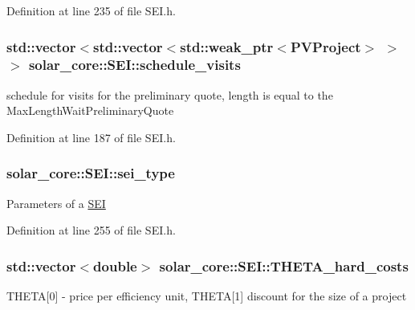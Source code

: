 Definition at line 235 of file S\+E\+I.\+h.

\hypertarget{classsolar__core_1_1_s_e_i_a8729d1aaf89da5d7d8b52761b65c881c}{}
\subsubsection[{schedule\+\_\+visits}]{\setlength{\rightskip}{0pt plus 5cm}std\+::vector$<$std\+::vector$<$std\+::weak\+\_\+ptr$<${\bf P\+V\+Project}$>$ $>$ $>$ solar\+\_\+core\+::\+S\+E\+I\+::schedule\+\_\+visits\hspace{0.3cm}{\ttfamily [protected]}}\label{classsolar__core_1_1_s_e_i_a8729d1aaf89da5d7d8b52761b65c881c}
schedule for visits for the preliminary quote, length is equal to the Max\+Length\+Wait\+Preliminary\+Quote 

Definition at line 187 of file S\+E\+I.\+h.

\hypertarget{classsolar__core_1_1_s_e_i_a788ef7ae27cee8b9b99b57eba9ab2981}{}
\subsubsection[{sei\+\_\+type}]{ solar\+\_\+core\+::\+S\+E\+I\+::sei\+\_\+type\hspace{0.3cm}{\ttfamily [protected]}}\label{classsolar__core_1_1_s_e_i_a788ef7ae27cee8b9b99b57eba9ab2981}
Parameters of a \hyperlink{classsolar__core_1_1_s_e_i}{S\+E\+I} 

Definition at line 255 of file S\+E\+I.\+h.

\hypertarget{classsolar__core_1_1_s_e_i_a4723f6d0e5098b9b2f553c9ef6c5545f}{}
\subsubsection[{T\+H\+E\+T\+A\+\_\+hard\+\_\+costs}]{\setlength{\rightskip}{0pt plus 5cm}std\+::vector$<$double$>$ solar\+\_\+core\+::\+S\+E\+I\+::\+T\+H\+E\+T\+A\+\_\+hard\+\_\+costs\hspace{0.3cm}{\ttfamily [protected]}}\label{classsolar__core_1_1_s_e_i_a4723f6d0e5098b9b2f553c9ef6c5545f}
T\+H\+E\+T\+A\mbox{[}0\mbox{]} -\/ price per efficiency unit, T\+H\+E\+T\+A\mbox{[}1\mbox{]} discount for the size of a project 

